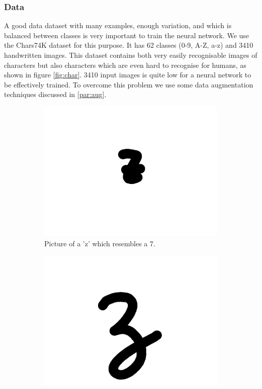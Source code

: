 \documentclass{article}
\begin{document}
\subsubsection{Data}
\label{sec:data}
A good data dataset with many examples, enough variation, and which is balanced between classes is very important to train the neural network. We use the Chars74K dataset for this purpose. It has 62 classes (0-9, A-Z, a-z) and 3410 handwritten images. This dataset contains both very easily recognisable images of characters but also characters which are even hard to recognise for humans, as shown in figure \ref{fig:char}. 3410 input images is quite low for a neural network to be effectively trained. To overcome this problem we use some data augmentation techniques discussed in \ref{par:aug}. 

\begin{figure}
\begin{subfigure}{.15\textwidth}
  \centering
  \includegraphics[width=\linewidth]{images/bad_char1}
  \caption{Picture of a 'z' which resembles a 7.}
\end{subfigure}
\begin{subfigure}{.15\textwidth}
  \centering
  \includegraphics[width=\linewidth]{images/bad_char2}

\end{subfigure}
\end{figure}
\end{document}
